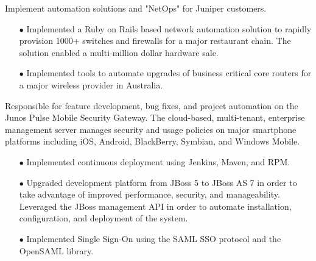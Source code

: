 \documentclass[12pt,letter,roman]{moderncv}
\begin{document}

Implement automation solutions and "NetOps" for Juniper customers.

\begin{itemize}

  \item[$\bullet$] Implemented a Ruby on Rails based network automation
      solution to rapidly provision 1000+ switches and firewalls for a major
      restaurant chain.  The solution enabled a multi-million dollar hardware
      sale.

  \item[$\bullet$] Implemented tools to automate upgrades of business critical
      core routers for a major wireless provider in Australia.

\end{itemize}

\vspace{0.5em}

Responsible for feature development, bug fixes, and project automation on the
Junos Pulse Mobile Security Gateway.  The cloud-based, multi-tenant, enterprise
management server manages security and usage policies on major
smartphone platforms including iOS, Android, BlackBerry, Symbian, and Windows
Mobile.

\begin{itemize}

    \item[$\bullet$] Implemented continuous deployment using Jenkins, Maven, and RPM.

    \item[$\bullet$] Upgraded development platform from JBoss 5 to JBoss AS 7 in order to
        take advantage of improved performance, security, and manageability.
        Leveraged the JBoss management API in order to automate installation,
        configuration, and deployment of the system.

    \item[$\bullet$] Implemented Single Sign-On using the SAML SSO protocol and the OpenSAML
        library.

\end{itemize}

\vspace{0.5em}
\end{document}
